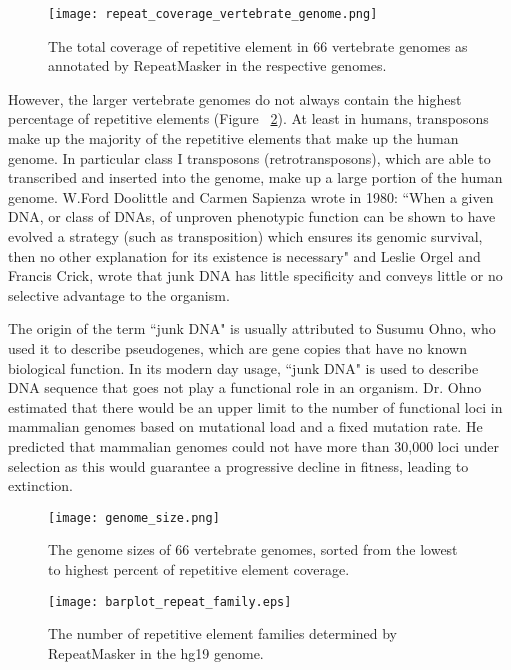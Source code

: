 \begin{figure}[h]
   \centering
   \texttt{[image: repeat\_coverage\_vertebrate\_genome.png]}
   \caption[Coverage of repetitive elements in vertebrate genomes]{The total coverage of repetitive element in 66 vertebrate genomes as annotated by RepeatMasker in the respective genomes\cite{tang2014repcoverage}.}
   \label{fig:repeat_coverage_vertebrate_genome}
\end{figure}

However, the larger vertebrate genomes do not always contain the highest percentage of repetitive elements (Figure ~\ref{fig:genome_size}). At least in humans, transposons make up the majority of the repetitive elements that make up the human genome. In particular class I transposons (retrotransposons), which are able to transcribed and inserted into the genome, make up a large portion of the human genome. W.Ford Doolittle and Carmen Sapienza wrote in 1980\cite{doolittle1980selfish}: ``When a given DNA, or class of DNAs, of unproven phenotypic function can be shown to have evolved a strategy (such as transposition) which ensures its genomic survival, then no other explanation for its existence is necessary" and Leslie Orgel and Francis Crick, wrote that junk DNA has little specificity and conveys little or no selective advantage to the organism\cite{orgel1980selfish}.

The origin of the term ``junk DNA" is usually attributed to Susumu Ohno, who used it to describe pseudogenes, which are gene copies that have no known biological function. In its modern day usage, ``junk DNA" is used to describe DNA sequence that goes not play a functional role in an organism. Dr. Ohno estimated that there would be an upper limit to the number of functional loci in mammalian genomes based on mutational load and a fixed mutation rate. He predicted that mammalian genomes could not have more than 30,000 loci under selection as this would guarantee a progressive decline in fitness, leading to extinction.

\begin{figure}[h]
   \centering
   \texttt{[image: genome\_size.png]}
   \caption[Vertebrate genomes sizes]{The genome sizes of 66 vertebrate genomes, sorted from the lowest to highest percent of repetitive element coverage\cite{tang2014gensize}.}
   \label{fig:genome_size}
\end{figure}

\begin{figure}[h]
   \centering
   \texttt{[image: barplot\_repeat\_family.eps]}
   \caption[Tally of repetitive element families in the hg19 genome]{The number of repetitive element families determined by RepeatMasker in the hg19 genome.}
   \label{fig:repeat_family}
\end{figure}

